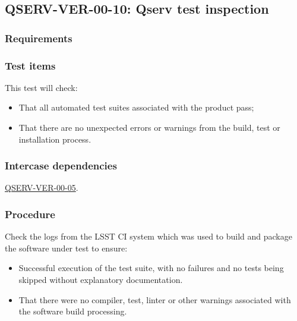 \subsection{\textsc{QSERV-VER-00-10}: Qserv test inspection}
\label{qserv-ver-00-10}

\subsubsection{Requirements}

\subsubsection{Test items}

This test will check:

\begin{itemize}
  \item{That all automated test suites associated with the product pass;}
  \item{That there are no unexpected errors or warnings from the build, test or installation process.}
\end{itemize}

\subsubsection{Intercase dependencies}

\hyperref[qserv-ver-00-05]{QSERV-VER-00-05}.

\subsubsection{Procedure}

Check the logs from the LSST CI system which was used to build and package the software under
test to ensure:

\begin{itemize}

  \item{Successful execution of the test suite, with no failures and no tests being skipped without
  explanatory documentation.}

  \item{That there were no compiler, test, linter or other warnings associated with the software
  build processing.}

\end{itemize}
